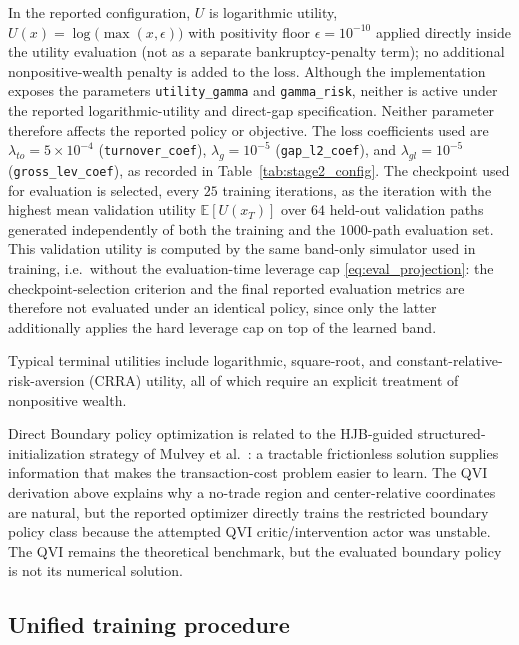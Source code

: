 \documentclass[a4paper,10pt]{article}
\newcommand{\E}{\mathbb{E}}
\begin{document}
In the reported configuration, $U$ is logarithmic utility, $U(x)=\log\bigl(\max(x,\epsilon)\bigr)$ with positivity floor $\epsilon=10^{-10}$ applied directly inside the utility evaluation (not as a separate bankruptcy-penalty term); no additional nonpositive-wealth penalty is added to the loss. Although the implementation exposes the parameters \texttt{utility\_gamma} and \texttt{gamma\_risk}, neither is active under the reported logarithmic-utility and direct-gap specification. Neither parameter therefore affects the reported policy or objective. The loss coefficients used are $\lambda_{to}=5\times10^{-4}$ (\texttt{turnover\_coef}), $\lambda_g=10^{-5}$ (\texttt{gap\_l2\_coef}), and $\lambda_{gl}=10^{-5}$ (\texttt{gross\_lev\_coef}), as recorded in Table~\ref{tab:stage2_config}. The checkpoint used for evaluation is selected, every $25$ training iterations, as the iteration with the highest mean validation utility $\E[U(x_T)]$ over $64$ held-out validation paths generated independently of both the training and the $1000$-path evaluation set. This validation utility is computed by the same band-only simulator used in training, i.e.\ without the evaluation-time leverage cap \eqref{eq:eval_projection}: the checkpoint-selection criterion and the final reported evaluation metrics are therefore not evaluated under an identical policy, since only the latter additionally applies the hard leverage cap on top of the learned band.

Typical terminal utilities include logarithmic, square-root, and constant-relative-risk-aversion (CRRA) utility, all of which require an explicit treatment of nonpositive wealth.

Direct Boundary policy optimization is related to the HJB-guided structured-initialization strategy of Mulvey et al.~\cite{mulvey2020}: a tractable frictionless solution supplies information that makes the transaction-cost problem easier to learn. The QVI derivation above explains why a no-trade region and center-relative coordinates are natural, but the reported optimizer directly trains the restricted boundary policy class because the attempted QVI critic/intervention actor was unstable. The QVI remains the theoretical benchmark, but the evaluated boundary policy is not its numerical solution.

\subsection{Unified training procedure}
\end{document}
